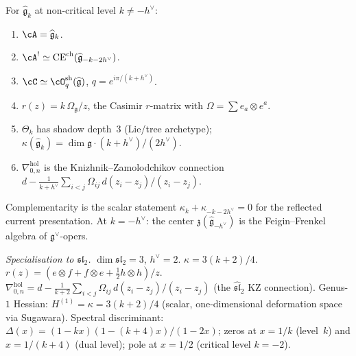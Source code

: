 \begin{computation}
\label{comp:affine-holographic-datum}
For $\widehat{\mathfrak g}_k$ at non-critical level $k\neq -h^\vee$:
\begin{enumerate}[label=\textup{(\roman*)}]
\item $\cA = \widehat{\mathfrak g}_k$.
\item $\cA^! \simeq
 \mathrm{CE}^{\mathrm{ch}}(\widehat{\mathfrak g}_{-k-2h^\vee})$.
\item $\cC \simeq \cO^{\mathrm{sh}}_q(\widehat{\mathfrak g})$,
 $q = e^{i\pi/(k+h^\vee)}$.
\item $r(z) = k\,\Omega_{\mathfrak g}/z$, the Casimir $r$-matrix
 with $\Omega = \sum e_a \otimes e^a$.
\item $\Theta_k$ has shadow depth~$3$ (Lie/tree archetype);
 $\kappa(\widehat{\mathfrak g}_k)
 = \dim\mathfrak g\cdot(k+h^\vee)/(2h^\vee)$.
\item $\nabla^{\mathrm{hol}}_{0,n}$ is the Knizhnik--Zamolodchikov
 connection
 $d - \frac{1}{k+h^\vee}\sum_{i<j}\Omega_{ij}\,d(z_i{-}z_j)/(z_i{-}z_j)$.
\end{enumerate}
Complementarity is the scalar statement
$\kappa_k + \kappa_{-k-2h^\vee} = 0$ for the reflected current
presentation.
At $k = -h^\vee$: the center
$\mathfrak z(\widehat{\mathfrak g}_{-h^\vee})$ is the
Feigin--Frenkel algebra of $\mathfrak g^\vee$-opers.

\emph{Specialisation to $\mathfrak{sl}_2$.}
$\dim\mathfrak{sl}_2=3$, $h^\vee=2$.
$\kappa = 3(k+2)/4$.
$r(z) = (e\otimes f + f\otimes e + \tfrac{1}{2}h\otimes h)/z$.
$\nabla^{\mathrm{hol}}_{0,n} =
d - \frac{1}{k+2}\sum_{i<j}\Omega_{ij}\,d(z_i{-}z_j)/(z_i{-}z_j)$
(the $\widehat{\mathfrak{sl}}_2$ KZ connection).
Genus-$1$ Hessian: $H^{(1)}=\kappa=3(k+2)/4$ (scalar,
one-dimensional deformation space via Sugawara).
Spectral discriminant:
$\Delta(x) = (1-kx)(1-(k{+}4)x)/(1-2x)$;
zeros at $x=1/k$ (level~$k$) and $x=1/(k{+}4)$ (dual level);
pole at $x=1/2$ (critical level $k=-2$).
\end{computation}

